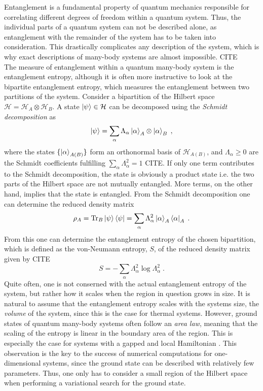 Entanglement is a fundamental property of quantum mechanics responsible for correlating different degrees of freedom within a quantum system. Thus, the individual parts of a quantum system can not be described alone, as entanglement with the remainder of the system has to be taken into consideration. This drastically complicates any description of the system, which is why exact descriptions of many-body systems are almost impossible. CITE \\
The measure of entanglement within a quantum many-body system is the entanglement entropy, although it is often more instructive to look at the bipartite entanglement entropy, which measures the entanglement between two partitions of the system.
Consider a bipartition of the Hilbert space $\mathcal{H} = \mathcal{H}_A \otimes \mathcal{H}_B$. A state $\ket{\psi} \in \mathcal{H}$ can be decomposed using the \textit{Schmidt decomposition} as
\begin{equation}
	\ket{\psi} = \sum_{\alpha} \Lambda_{\alpha} \ket{\alpha}_A \otimes \ket{\alpha}_B \; ,
\end{equation}
where the states $\{ \ket{\alpha}_{A(B)} \}$ form an orthonormal basis of $\mathcal{H}_{A(B)}$, and $\Lambda_{\alpha} \ge 0$ are the Schmidt coefficients fulfilling $\sum_{\alpha} \Lambda_{\alpha}^2 = 1$ CITE. If only one term contributes to the Schmidt decomposition, the state is obviously a product state i.e. the two parts of the Hilbert space are not mutually entangled. More terms, on the other hand, implies that the state is entangled. From the Schmidt decomposition one can determine the reduced density matrix
\begin{equation}
	\rho_A = \Tr _B \ket{\psi}\bra{\psi} = \sum_{\alpha} \Lambda_{\alpha}^2 \ket{\alpha}_A \bra{\alpha}_A \; .  
\end{equation}
From this one can determine the entanglement entropy of the chosen bipartition, which is defined as the von-Neumann entropy, $S$, of the reduced density matrix given by CITE
\begin{equation}
	S = - \sum_{\alpha} \Lambda_{\alpha}^2 \log \Lambda_{\alpha}^2 \; .
\end{equation}
Quite often, one is not conserned with the actual entanglement entropy of the system, but rather how it scales when the region in question grows in size. It is natural to assume that the entanglement entropy scales with the systems size, the \textit{volume} of the system, since this is the case for thermal systems. However, ground states of quantum many-body systems often follow an \textit{area law}, meaning that the scaling of the entropy is linear in the boundary area of the region. This is especially the case for systems with a gapped and local Hamiltonian \cite{Cramer}. This observation is the key to the success of numerical computations for one-dimensional systems, since the ground state can be described with relatively few parameters. Thus, one only has to consider a small region of the Hilbert space when performing a variational search for the ground state.\\
